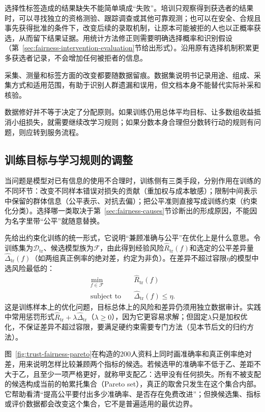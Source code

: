 选择性标签造成的结果缺失不能简单填成“失败”。培训只观察得到获选者的结果时，可以寻找独立的资格测验、跟踪调查或其他可靠观测；也可以在安全、合规且事先获得批准的条件下，改变后续的录取机制，让原本可能被拒的人也以正概率获选，从而留下结果证据。用统计方法修正则需要明确选择概率和识别假设（第~\ref{sec:fairness-intervention-evaluation}节给出形式）。沿用原有选择机制积累更多获选者记录，不会增加任何被拒者的信息。

采集、测量和标签方面的改变都要随数据留痕。数据集说明书记录用途、组成、采集方式和适用范围，有助于识别人群遗漏和误用，但文档本身不能替代实际补采和核验。

数据修好并不等于决定了分配原则。如果训练仍用总体平均目标、让多数组收益抵消小组损失，就需要继续改学习规则；如果分数本身合理但分数转行动的规则有问题，则应转到服务流程。

\subsection{训练目标与学习规则的调整}
\label{sec:fairness-learning-intervention}

当问题是模型对已有信息的使用不合理时，训练侧有三类手段，分别作用在训练的不同环节：改变不同样本错误对损失的贡献（重加权与成本敏感）；限制中间表示中保留的群体信息（公平表示、对抗去偏）；把公平准则直接写成训练约束（约束化分类）。选择哪一类取决于第~\ref{sec:fairness-causes}节诊断出的形成原因，不能因为名字里带“公平”就随意替换。

先给出约束化训练的统一形式，它说明“兼顾准确与公平”在优化上是什么意思。令训练集为$\mathcal D_{\mathrm{tr}}$、候选模型族为$\mathcal F$，由此得到经验风险$\widehat R_{\mathrm{tr}}(f)$和选定的公平差异量$\widehat\Delta_{\mathrm{tr}}(f)$（如两组真正例率的绝对差，约定为非负）。在差异不超过容限$\eta$的模型中选风险最低的：
\[
\begin{aligned}
 \min_{f\in\mathcal F}\quad &\widehat R_{\mathrm{tr}}(f)\\
 \text{subject to}\quad &\widehat\Delta_{\mathrm{tr}}(f)\leq\eta.
\end{aligned}
\]
这是训练样本上的优化问题，目标总体上的风险和差异仍须用独立数据审计。实践中常用惩罚形式$\widehat R_{\mathrm{tr}}+\lambda\widehat\Delta_{\mathrm{tr}}$（$\lambda\geq0$），因为它更容易求解；但固定$\lambda$只是加权优化，不保证差异不超过容限，要满足硬约束需要专门方法（见本节后文的归约方法）。

图~\ref{fig:trust-fairness-pareto}在构造的200人资料上同时画准确率和真正例率绝对差，用来说明怎样比较兼顾两个指标的候选。若候选甲的准确率不低于乙、差距不大于乙，且至少一项严格更好，就称甲支配乙：选甲没有任何损失。所有不被支配的候选构成当前的帕累托集合（Pareto set），真正的取舍只发生在这个集合内部。它帮助看清“提高公平要付出多少准确率、是否存在免费改进”；但换候选集、指标或评价数据都会改变这个集合，它不是普遍适用的最优边界。

